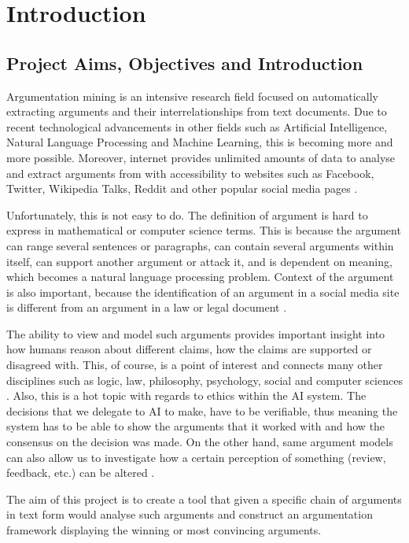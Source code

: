\section{Introduction}
\subsection{Project Aims, Objectives and Introduction} 
 Argumentation mining is an intensive research field focused on automatically extracting arguments and their interrelationships from text documents. Due to recent technological advancements in other fields such as Artificial Intelligence, Natural Language Processing and Machine Learning, this is becoming more and more possible. Moreover, internet provides unlimited amounts of data to analyse and extract arguments from with accessibility to websites such as Facebook, Twitter, Wikipedia Talks, Reddit and other popular social media pages \citep{ArgMiningStateOfTheArt}. 
 
 Unfortunately, this is not easy to do. The definition of argument is hard to express in mathematical or computer science terms. This is because the argument can range several sentences or paragraphs, can contain several arguments within itself, can support another argument or attack it, and is dependent on meaning, which becomes a natural language processing problem. Context of the argument is also important, because the identification of an argument in a social media site is different from an argument in a law or legal document \citep{Cocarascu2017MiningBA}.

 The ability to view and model such arguments provides important insight into how humans reason about different claims, how the claims are supported or disagreed with. This, of course, is a point of interest and connects many other disciplines such as logic, law, philosophy, psychology, social and computer sciences \citep{ArgMiningStateOfTheArt}. Also, this is a hot topic with regards to ethics within the AI system. The decisions that we delegate to AI to make, have to be verifiable, thus meaning the system has to be able to show the arguments that it worked with and how the consensus on the decision was made. On the other hand, same argument models can also allow us to investigate how a certain perception of something (review, feedback, etc.) can be altered \citep{ApproxToTruth}.
 
 The aim of this project is to create a tool that given a specific chain of arguments in text form would analyse such arguments and construct an argumentation framework displaying the winning or most convincing arguments. 
 

